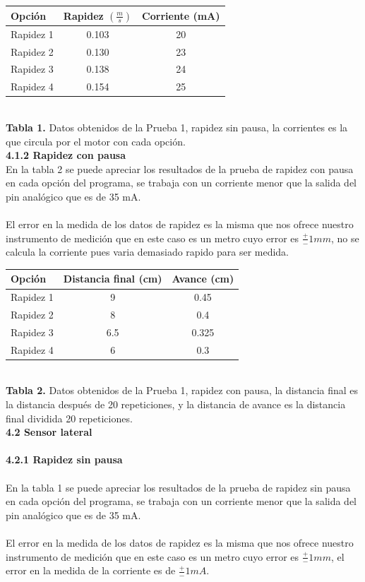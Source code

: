 \documentclass[12]{article}
\begin{document}
\begin{multicols}{2}
\begin{tabular}{|l|c|c|} 
\hline
\bf{Opción} &  \bf{Rapidez $(\frac{m}{s})$} & \bf{Corriente (mA)}\\
\hline
Rapidez 1 & 0.103 & 20 \\
\hline
Rapidez 2 & 0.130 & 23 \\
\hline
Rapidez 3 & 0.138 & 24 \\
\hline 
Rapidez 4 & 0.154 & 25 \\
\hline
\end{tabular}
\\
\textbf{Tabla 1.} Datos obtenidos de la Prueba 1, rapidez sin pausa, la corrientes es la que circula por el motor con cada opción. \\

{\bf{4.1.2 Rapidez con pausa}} \\
En la tabla 2 se puede apreciar los resultados de la prueba de rapidez con pausa en cada opción del programa, se trabaja con un corriente menor que la salida del pin analógico que es de 35 mA.\\\\
El error en la medida de los datos de rapidez es la misma que nos ofrece nuestro instrumento de medición que en este caso es un metro cuyo error es $\frac{+}{-} 1 mm$, no se calcula la corriente pues varia demasiado rapido para ser medida.\\

\begin{tabular}{|l|c|c|} 
\hline
\bf{Opción} & Distancia final (cm) & Avance (cm)\\
\hline
Rapidez 1 & 9 &0.45 \\
\hline
Rapidez 2 & 8 &0.4 \\
\hline
Rapidez 3 & 6.5 &0.325 \\
\hline 
Rapidez 4 & 6 & 0.3 \\
\hline
\end{tabular}
\\
\textbf{Tabla 2.} Datos obtenidos de la Prueba 1, rapidez con pausa, la distancia final es la distancia después de 20 repeticiones, y la distancia de avance es la distancia final dividida 20 repeticiones. \\

{\bf{4.2 Sensor lateral}} \\\\
{\bf{4.2.1 Rapidez sin pausa}}\\\\
En la tabla 1 se puede apreciar los resultados de la prueba de rapidez sin pausa en cada opción del programa, se trabaja con un corriente menor que la salida del pin analógico que es de 35 mA.\\\\
El error en la medida de los datos de rapidez es la misma que nos ofrece nuestro instrumento de medición que en este caso es un metro cuyo error es $\frac{+}{-} 1 mm$, el error en la medida de la corriente es de $\frac{+}{-} 1 mA$.\\








\end{multicols}
\end{document}
